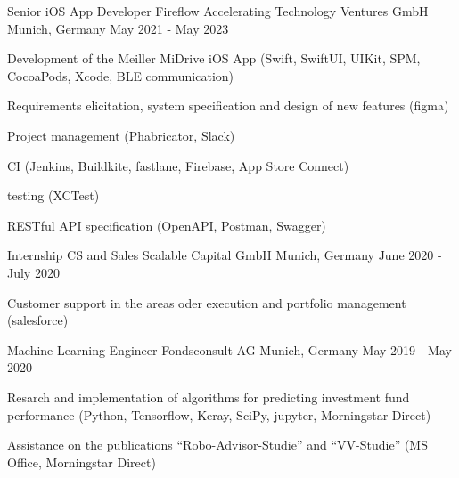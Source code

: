 


\begin{cventries}


\cventry
{Senior iOS App Developer} %
{Fireflow Accelerating Technology Ventures GmbH} %
{Munich, Germany} %
{May 2021 - May 2023} %
{ %
\begin{cvitems}
\item {Development of the Meiller MiDrive iOS App (Swift, SwiftUI, UIKit, SPM, CocoaPods, Xcode, BLE communication)}
\item {Requirements elicitation, system specification and design of new features (figma)}
\item {Project management (Phabricator, Slack)}
\item {CI (Jenkins, Buildkite, fastlane, Firebase, App Store Connect)}
\item {testing (XCTest)}
\item {RESTful API specification (OpenAPI, Postman, Swagger)}
\end{cvitems}
}


\cventry
{Internship CS and Sales} %
{Scalable Capital GmbH} %
{Munich, Germany} %
{June 2020 - July 2020} %
{ %
\begin{cvitems}
\item {Customer support in the areas oder execution and portfolio management (salesforce)}
\end{cvitems}
}


\cventry
{Machine Learning Engineer} %
{Fondsconsult AG} %
{Munich, Germany} %
{May 2019 - May 2020} %
{ %
\begin{cvitems}
\item {Resarch and implementation of algorithms for predicting  investment fund performance (Python, Tensorflow, Keray, SciPy, jupyter, Morningstar Direct)}
\item {Assistance on the publications ``Robo-Advisor-Studie'' and ``VV-Studie'' (MS Office, Morningstar Direct)}
\end{cvitems}
}


\end{cventries}

